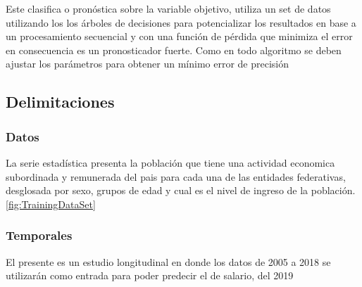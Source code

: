 Este clasifica o pron\'ostica sobre la variable objetivo, utiliza un set de datos utilizando los los \'arboles de decisiones para potencializar los resultados en base a un procesamiento secuencial y con una funci\'on de p\'erdida  que minimiza el error en consecuencia es un pronosticador fuerte. Como en todo algoritmo se deben ajustar los par\'ametros para obtener un m\'inimo error de precisi\'on


\subsection{Delimitaciones}
\subsubsection{Datos}
La serie estad\'istica presenta la poblaci\'on que tiene una actividad economica subordinada y remunerada del pais para cada una de las entidades federativas, desglosada por sexo, grupos de edad y cual es el nivel de ingreso de la poblaci\'on.\ref{fig:TrainingDataSet}\cite{datosAbiertos_2019}
\subsubsection{Temporales}
El presente es un estudio longitudinal en donde los datos de 2005 a 2018 se utilizar\'an como entrada para poder predecir el de salario, del 2019

